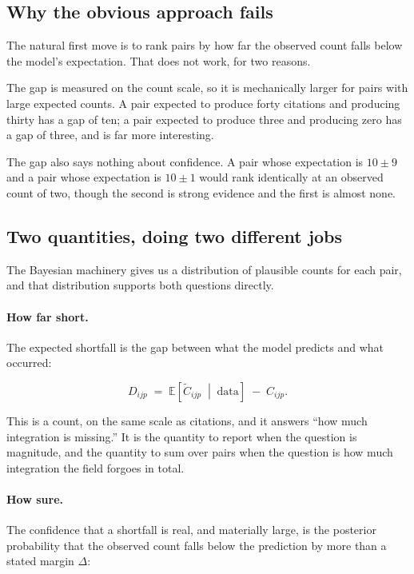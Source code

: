 \documentclass[11pt]{article}
\begin{document}
\subsection{Why the obvious approach fails}

The natural first move is to rank pairs by how far the observed count falls below the model's
expectation. That does not work, for two reasons.

The gap is measured on the count scale, so it is mechanically larger for pairs with large
expected counts. A pair expected to produce forty citations and producing thirty has a gap of
ten; a pair expected to produce three and producing zero has a gap of three, and is far more
interesting.

The gap also says nothing about confidence. A pair whose expectation is $10 \pm 9$ and a pair
whose expectation is $10 \pm 1$ would rank identically at an observed count of two, though the
second is strong evidence and the first is almost none.

\subsection{Two quantities, doing two different jobs}

The Bayesian machinery gives us a distribution of plausible counts for each pair, and that
distribution supports both questions directly.

\paragraph{How far short.} The expected shortfall is the gap between what the model predicts
and what occurred:

\begin{equation}
D_{ijp} \;=\; \mathbb{E}\!\left[\tilde{C}_{ijp} \;\middle|\; \text{data}\right] \;-\; C_{ijp}.
\end{equation}

This is a count, on the same scale as citations, and it answers ``how much integration is
missing.'' It is the quantity to report when the question is magnitude, and the quantity to
sum over pairs when the question is how much integration the field forgoes in total.

\paragraph{How sure.} The confidence that a shortfall is real, and materially large, is the
posterior probability that the observed count falls below the prediction by more than a
stated margin $\Delta$:
\end{document}
